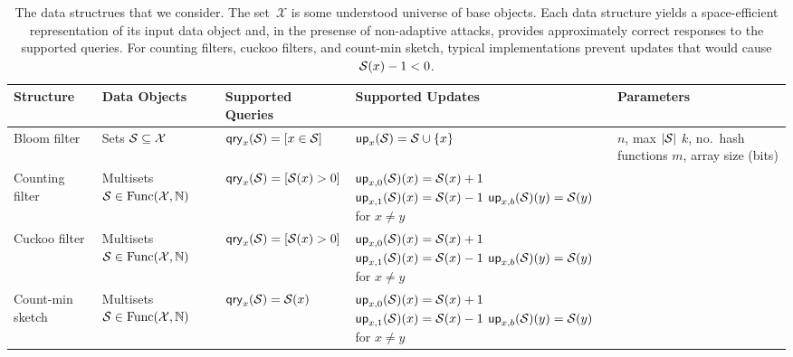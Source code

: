 \begin{table}[t]
\begin{center}
\small
  \begin{tabular}{ | l | p{2.5cm} | p{3.0cm} | p{4cm} | p{3cm}|}
    \hline
    {\bf Structure} & {\bf Data Objects} & {\bf Supported Queries} & {\bf Supported Updates} & {\bf Parameters} \\ \hline
    Bloom filter 
          & \parbox[c][6ex]{4cm}{Sets\\$\mathcal{S}\subseteq \mathcal{X}$} %
          & $\mathsf{qry}_x(\mathcal{S}) = [x \in \mathcal{S}]$
          &  $\mathsf{up}_x(\mathcal{S}) = \mathcal{S} \cup \{x\}$ 
          & \parbox[c]{4cm}{$n$, max $|\mathcal{S}|$\\$k$, no.\ hash functions\\$m$, array size (bits)} 
          \\\hline
    Counting filter 
          & \parbox[c]{3.5cm}{Multisets\\ $\mathcal{S} \in \mathrm{Func}(\mathcal{X},\mathbb{N})$}
          & $\mathsf{qry}_x(\mathcal{S}) = [\mathcal{S}(x) > 0]$
          & \parbox[c][10ex]{4cm}{$\mathsf{up}_{x,0}(\mathcal{S})(x) = \mathcal{S}(x)+1$ \\ $\mathsf{up}_{x,1}(\mathcal{S})(x) = \mathcal{S}(x)-1$ \\ $\mathsf{up}_{x,b}(\mathcal{S})(y) = \mathcal{S}(y)$ for $x \neq y$}
          & \parbox[c]{3cm}{}
         \\ \hline
    Cuckoo filter
          & \parbox[c]{3.5cm}{Multisets\\ $\mathcal{S} \in \mathrm{Func}(\mathcal{X},\mathbb{N})$}
          & $\mathsf{qry}_x(\mathcal{S}) = [\mathcal{S}(x) > 0]$
          & \parbox[c][10ex]{4cm}{$\mathsf{up}_{x,0}(\mathcal{S})(x) = \mathcal{S}(x)+1$ \\ $\mathsf{up}_{x,1}(\mathcal{S})(x) = \mathcal{S}(x)-1$ \\ $\mathsf{up}_{x,b}(\mathcal{S})(y) = \mathcal{S}(y)$ for $x \neq y$}
          & \parbox[c]{3cm}{}
          \\ \hline
     Count-min sketch
          & \parbox[c]{3.5cm}{Multisets\\ $\mathcal{S} \in \mathrm{Func}(\mathcal{X},\mathbb{N})$}
          & $\mathsf{qry}_x(\mathcal{S}) = \mathcal{S}(x)$
          & \parbox[c][10ex]{4cm}{$\mathsf{up}_{x,0}(\mathcal{S})(x) = \mathcal{S}(x)+1$ \\ $\mathsf{up}_{x,1}(\mathcal{S})(x) = \mathcal{S}(x)-1$ \\ $\mathsf{up}_{x,b}(\mathcal{S})(y) = \mathcal{S}(y)$ for $x \neq y$}
          & \parbox[c]{3cm}{}
          \\ \hline
   
  \end{tabular}
\end{center}
\caption{The data structrues that we consider.  The set~$\mathcal{X}$ is some understood universe of base objects.  Each data structure yields a space-efficient representation of its input data object and, in the presense of non-adaptive attacks, provides approximately correct responses to the supported queries.  For counting filters, cuckoo filters, and count-min sketch, typical implementations prevent updates that would cause $\mathcal{S}(x)-1 < 0$.}
\end{table}

